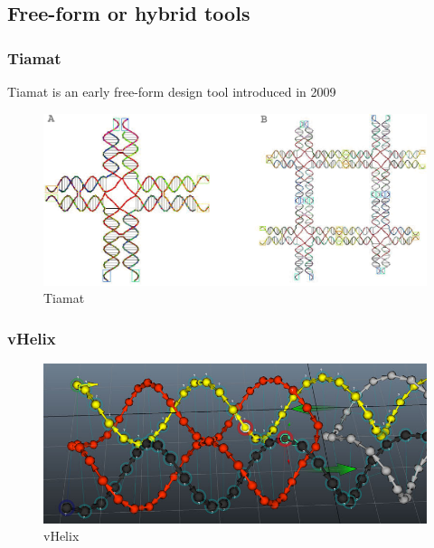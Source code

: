 \subsection{Free-form or hybrid tools}

\subsubsection{Tiamat}
Tiamat is an early free-form design tool introduced in 2009

\begin{figure}[h]
  \begin{center}
    \includegraphics[width=\textwidth]{figures/tiamat.png}
    \caption{Tiamat}
    \label{fig:tiamat}
  \end{center}
\end{figure}

\subsubsection{vHelix}

\begin{figure}[h]
  \begin{center}
    \includegraphics[width=\textwidth]{figures/vhelix.jpg}
    \caption{vHelix}
    \label{fig:vhelix}
  \end{center}
\end{figure}


